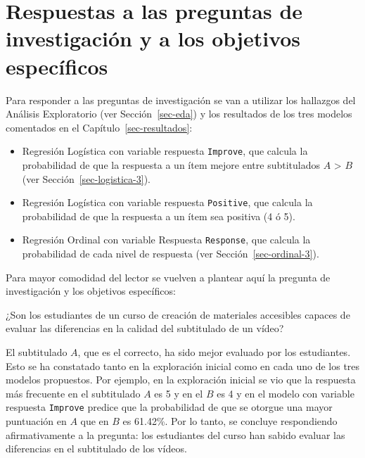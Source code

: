 \documentclass[
  12pt,
  a4paper,
  extrafontsizes,
  onecolumn,
  openright,
  table]{memoir}
\providecommand{\tightlist}{%
  \setlength{\itemsep}{0pt}\setlength{\parskip}{0pt}}\usepackage{longtable,booktabs,array}
\begin{document}
\hypertarget{respuestas-a-las-preguntas-de-investigaciuxf3n-y-a-los-objetivos-especuxedficos}{%
\section{Respuestas a las preguntas de investigación y a los objetivos
específicos}\label{respuestas-a-las-preguntas-de-investigaciuxf3n-y-a-los-objetivos-especuxedficos}}

Para responder a las preguntas de investigación se van a utilizar los
hallazgos del Análisis Exploratorio (ver Sección~\ref{sec-eda}) y los
resultados de los tres modelos comentados en el
Capítulo~\ref{sec-resultados}:

\begin{itemize}
\tightlist
\item
  \gls{Regresión Logística} con variable respuesta \texttt{Improve}, que
  calcula la probabilidad de que la respuesta a un ítem mejore entre
  subtitulados \(A\) \textgreater{} \(B\) \nobreak (ver
  Sección~\ref{sec-logistica-3}).
\item
  \gls{Regresión Logística} con variable respuesta \texttt{Positive},
  que calcula la probabilidad de que la respuesta a un ítem sea positiva
  (4 ó 5).
\item
  \gls{Regresión Ordinal} con variable Respuesta \texttt{Response}, que
  calcula la probabilidad de cada nivel de respuesta (ver
  Sección~\ref{sec-ordinal-3}).
\end{itemize}

Para mayor comodidad del lector se vuelven a plantear aquí la pregunta
de investigación y los objetivos específicos:

\begin{tcolorbox}[enhanced jigsaw, arc=.35mm, bottomtitle=1mm, left=2mm, toptitle=1mm, breakable, opacitybacktitle=0.6, rightrule=.15mm, toprule=.15mm, colbacktitle=quarto-callout-note-color!10!white, leftrule=.75mm, colframe=quarto-callout-note-color-frame, colback=white, titlerule=0mm, opacityback=0, bottomrule=.15mm, coltitle=black, title=\textcolor{quarto-callout-note-color}{\faInfo}\hspace{0.5em}{Pregunta de investigación}]

¿Son los estudiantes de un curso de creación de materiales accesibles
capaces de evaluar las diferencias en la calidad del subtitulado de un
vídeo?

\end{tcolorbox}

El subtitulado \(A\), que es el correcto, ha sido mejor evaluado por los
estudiantes. Esto se ha constatado tanto en la exploración inicial como
en cada uno de los tres modelos propuestos. Por ejemplo, en la
exploración inicial se vio que la respuesta más frecuente en el
subtitulado \(A\) es 5 y en el \(B\) es 4 y en el modelo con variable
respuesta \texttt{Improve} predice que la probabilidad de que se otorgue
una mayor puntuación en \(A\) que en \(B\) es 61.42\%. Por lo tanto, se
concluye respondiendo afirmativamente a la pregunta: los estudiantes del
curso han sabido evaluar las diferencias en el subtitulado de los
vídeos.
\end{document}
